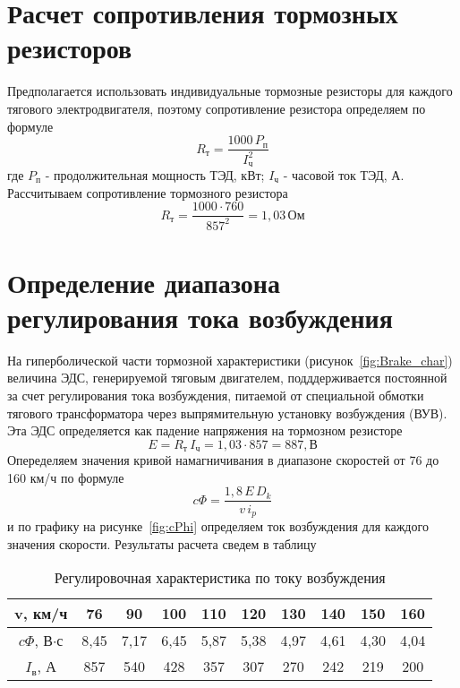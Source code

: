 \section{Расчет сопротивления тормозных резисторов}

Предполагается использовать индивидуальные тормозные резисторы для каждого тягового электродвигателя, поэтому сопротивление резистора определяем по формуле
\begin{equation}
 \label{eq:brake_resistor}
 R_{\text{т}} = \frac{1000 \, P_{\text{п}}}{I_{\text{ч}}^2}
\end{equation}
где $P_{\text{п}}$ - продолжительная мощность ТЭД, кВт; $I_{\text{ч}}$ - часовой ток ТЭД, А. Рассчитываем сопротивление тормозного резистора
\begin{equation*}
 R_{\text{т}} = \frac{1000 \cdot 760}{857^2} = 1,03 \, \text{Ом}
\end{equation*}

\section{Определение диапазона регулирования тока возбуждения}

На гиперболической части тормозной характеристики (рисунок~\ref{fig:Brake_char}) величина ЭДС, генерируемой тяговым двигателем, подддерживается постоянной за счет регулирования тока возбуждения, питаемой от специальной обмотки тягового трансформатора через выпрямительную установку возбуждения (ВУВ). Эта ЭДС определяется как падение напряжения на тормозном резисторе
\begin{equation*}
 E = R_{\text{т}} \, I_{\text{ч}} = 1,03 \cdot 857 = 887, \text{В}
\end{equation*}
Опеределяем значения кривой намагничивания в диапазоне скоростей от 76 до 160 км/ч по формуле
\begin{equation}
 \label{eq:cPhi_reg}
 c\Phi = \frac{1,8 \, E \, D_k}{v \, i_p}
\end{equation}
и по графику на рисунке~\ref{fig:cPhi} определяем ток возбуждения для каждого значения скорости. Результаты расчета сведем в таблицу

\begin{table}[H]
 \centering
 \caption{Регулировочная характеристика по току возбуждения}
 \begin{tabular}{|c||c|c|c|c|c|c|c|c|c|}
  \hline
  v, км/ч & 76 & 90 & 100 & 110 & 120 & 130 & 140 & 150 & 160 \\ \hline
  $c\Phi$, В$\cdot$с & 8,45 & 7,17 & 6,45 & 5,87 & 5,38 & 4,97 & 4,61 & 4,30 & 4,04 \\ \hline 
  $I_{\text{в}}$, А & 857 & 540 & 428 & 357 & 307 & 270 & 242 & 219 & 200 \\ \hline 
 \end{tabular}
 \label{tab:I_field_reg}
\end{table}

